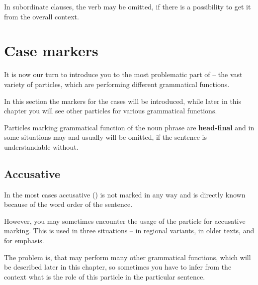 
In subordinate clauses, the verb may be omitted, if there is a possibility to
get it from the overall context.

\section{Case markers}
\label{sec:cases}

It is now our turn to introduce you to the most problematic part of \andro --
the vast variety of particles, which are performing different grammatical
functions.

In this section the markers for the cases will be introduced, while later in
this chapter you will see other particles for various grammatical functions.

Particles marking grammatical function of the noun phrase are
\textbf{head-final} and in some situations may and usually will be omitted, if
the sentence is understandable without.

\subsection{Accusative}

In the most cases accusative (\Acc{}) is not marked in any way and is directly
known because of the word order of the sentence.


However, you may sometimes encounter the usage of the  particle for
accusative marking. This is used in three situations -- in regional variants, in
older texts, and for emphasis.


The problem is, that  may perform many other grammatical functions,
which will be described later in this chapter, so sometimes you have to infer
from the context what is the role of this particle in the particular sentence.

